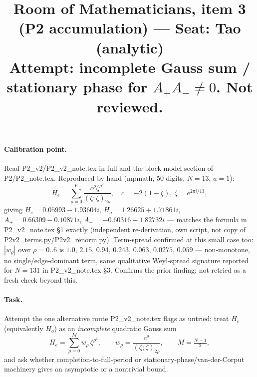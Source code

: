 \documentclass[11pt]{article}
\title{Room of Mathematicians, item 3 (P2 accumulation) — Seat: Tao (analytic)\\
\small Attempt: incomplete Gauss sum / stationary phase for $A_+A_-\neq0$. Not reviewed.}
\date{}
\begin{document}
\maketitle

\paragraph{Calibration point.} Read P2\_v2/P2\_v2\_note.tex in full and the block-model section of P2/P2\_note.tex.
Reproduced by hand (mpmath, 50 digits, $N=13$, $a=1$):
\[H_e=\sum_{\rho=0}^{6}\frac{c^\rho\zeta^{\rho^2}}{(\zeta;\zeta)_{2\rho}},\quad
c=-2(1-\zeta),\ \zeta=e^{2\pi i/13},\]
giving $H_e=0.05993-1.93604i$, $H_o=1.26625+1.71861i$, $A_+=0.66309-0.10871i$,
$A_-=-0.60316-1.82732i$ — matches the formula in P2\_v2\_note.tex \S1 exactly (independent
re-derivation, own script, not copy of P2v2\_terms.py/P2v2\_renorm.py). Term-spread confirmed at this
small case too: $|w_\rho|$ over $\rho=0..6$ is $1.0,\,2.15,\,0.94,\,0.243,\,0.063,\,0.0275,\,0.059$ —
non-monotone, no single/edge-dominant term, same qualitative Weyl-spread signature reported for
$N=131$ in P2\_v2\_note.tex \S3. Confirms the prior finding; not retried as a fresh check beyond this.

\paragraph{Task.} Attempt the one alternative route P2\_v2\_note.tex flags as untried: treat $H_e$
(equivalently $H_o$) as an \emph{incomplete} quadratic Gauss sum
\[H_e=\sum_{\rho=0}^{M}w_\rho\,\zeta^{\rho^2},\qquad w_\rho=\frac{c^\rho}{(\zeta;\zeta)_{2\rho}},\qquad
M=\tfrac{N-1}2,\]
and ask whether completion-to-full-period or stationary-phase/van-der-Corput machinery gives an
asymptotic or a nontrivial bound.
\end{document}
